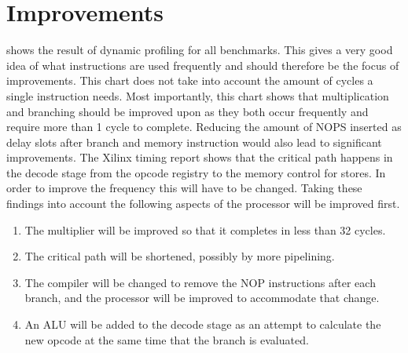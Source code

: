 \documentclass[final]{article}
\begin{document}
\section{Improvements}
\label{sec:improvements}

 shows the result of dynamic profiling for all benchmarks. This gives a very good idea of what instructions are used frequently and should therefore be the focus of improvements. This chart does not take into account the amount of cycles a single instruction needs. Most importantly, this chart shows that multiplication and branching should be improved upon as they both occur frequently and require more than 1 cycle to complete. Reducing the amount of NOPS inserted as delay slots after branch and memory instruction would also lead to significant improvements. The Xilinx timing report shows that the critical path happens in the decode stage from the opcode registry to the memory control for stores. In order to improve the frequency this will have to be changed. Taking these findings into account the following aspects of the processor will be improved first.

\begin{enumerate}
\item The multiplier will be improved so that it completes in less than 32 cycles.
\item The critical path will be shortened, possibly by more pipelining.
\item The compiler will be changed to remove the NOP instructions after each branch, and the processor will be improved to accommodate that change.
\item An ALU will be added to the decode stage as an attempt to calculate the new opcode at the same time that the branch is evaluated.
\end{enumerate}

\end{document}
